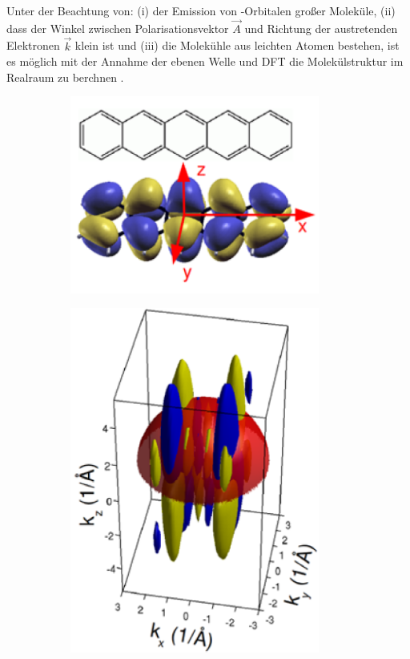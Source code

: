         Unter der Beachtung von: (i) der Emission von \pi-Orbitalen großer Moleküle, (ii) dass der Winkel zwischen Polarisationsvektor $\vec{A}$ und Richtung der austretenden Elektronen $\vec{k}$ klein ist und (iii) die Molekühle aus leichten Atomen bestehen, ist es möglich mit der Annahme der ebenen Welle und DFT die Molekülstruktur im Realraum zu berchnen \cite{MM_2}.
        \begin{figure}
            \centering
            \begin{subfigure}{0.3\textwidth}
                \centering
                \includegraphics[width=0.9\textwidth]{./content/DFT1.PNG}
                \caption{}
                \label{fig:DFT1}
            \end{subfigure}
            \begin{subfigure}{0.3\textwidth}
                \centering
                \includegraphics[width=0.9\textwidth]{./content/DFT2.PNG}

\end{subfigure}
\end{figure}

